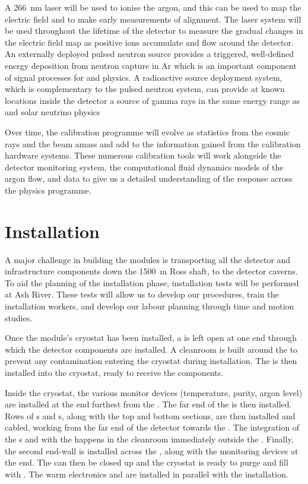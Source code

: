 A \SI{266}{\nano\meter} laser will be used to ionise the argon, and this can be used to map the electric field and to make early measurements of  alignment. The laser system will be used throughout the lifetime of the detector to measure the gradual changes in the electric field map as positive ions accumulate and flow around the detector.
An externally deployed pulsed neutron source provides a triggered, well-defined energy deposition from neutron capture in Ar which is an important component of signal processes for  and  physics. A radioactive source deployment system, which is complementary to the pulsed neutron system, can provide at known locations inside the detector a source of gamma rays in the same energy range as  and solar neutrino physics

Over time, the  calibration programme will evolve as statistics from the cosmic rays and the  beam amass and add to the information gained from the calibration hardware systems. These numerous calibration tools will work alongside the detector monitoring system, the computational fluid dynamics models of the argon flow, and  data to give us a detailed understanding of the  response across the  physics programme.


\section{Installation}

A major challenge in building the   modules is transporting all the detector and infrastructure components down the \SI{1500}{\meter} Ross shaft, to the detector caverns. To aid the planning of the installation phase, installation tests will be performed at Ash River. These tests will allow us to develop our procedures, train the installation workers, and develop our labour planning through time and motion studies.

Once the module's cryostat has been installed, a  is left open at one end through which the detector components are installed. A cleanroom is built around the  to prevent any contamination entering the cryostat during installation. The  is then installed into the cryostat, ready to receive the  components. 

Inside the cryostat, the various monitor devices (temperature, purity, argon level) are installed at the end furthest from the . The far end of the  is then installed. Rows of s and s, along with the top and bottom  sections, are then installed and cabled, working from the far end of the detector towards the . The integration of the s and  with the  happens in the cleanroom immediately outside the . Finally, the second  end-wall is installed across the , along with the monitoring devices at the  end. The  can then be closed up and the cryostat is ready to purge and fill with . The warm electronics and  are installed in parallel with the  installation.

